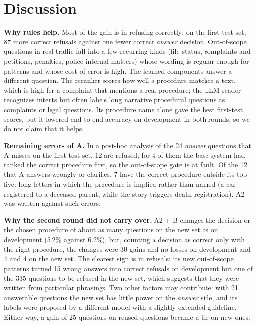 \section{Discussion}

\textbf{Why rules help.} Most of the gain is in refusing correctly: on the first test set, 87 more correct refusals against one fewer
correct \emph{answer} decision. Out-of-scope questions in real traffic fall into a few recurring kinds (file status, complaints and
petitions, penalties, police internal matters) whose wording is regular enough for patterns and whose cost of error is high. The learned
components answer a different question. The reranker scores how well a procedure matches a text, which is high for a complaint that
mentions a real procedure; the LLM reader recognizes intents but often labels long narrative procedural questions as complaints or legal
questions. Its procedure name alone gave the best first-test scores, but it lowered end-to-end accuracy on development in both rounds, so
we do not claim that it helps.

\textbf{Remaining errors of A.} In a post-hoc analysis of the 24 \emph{answer} questions that A misses on the first test set, 12 are
refused; for 4 of them the base system had ranked the correct procedure first, so the out-of-scope gate is at fault. Of the 12 that A
answers wrongly or clarifies, 7 have the correct procedure outside its top five: long letters in which the procedure is implied rather
than named (a car registered to a deceased parent, while the story triggers death registration). A2 was written against such errors.

\textbf{Why the second round did not carry over.} A2 + B changes the decision or the chosen procedure of about as many questions on the new
set as on development (5.2\% against 6.2\%), but, counting a decision as correct only with the right procedure, the changes were 30 gains
and no losses on development and 4 and 4 on the new set. The clearest sign is in refusals: its new out-of-scope patterns turned 15 wrong
answers into correct refusals on development but one of the 335 questions to be refused in the new set, which suggests that they were
written from particular phrasings. Two other factors may contribute: with 21 answerable questions the new set has little power on the
\emph{answer} side, and its labels were proposed by a different model with a slightly extended guideline. Either way, a gain of 25
questions on reused questions became a tie on new ones.

